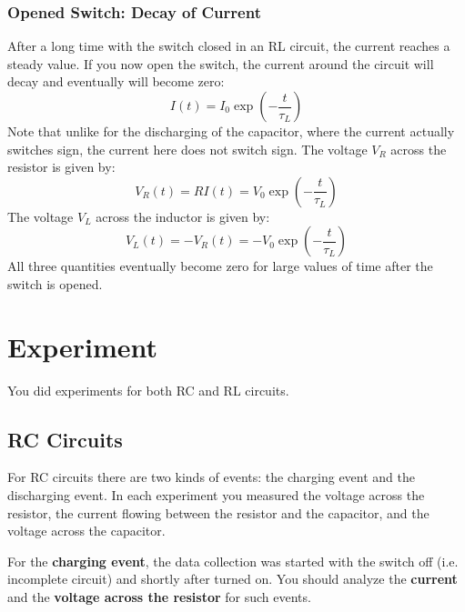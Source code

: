 \subsubsection{Opened Switch: Decay of Current}
After a long time with the switch closed in an RL circuit, the current reaches a steady value. If you now open the switch, the current around the circuit will decay and eventually will become zero:
\begin{equation}
    I(t) = I_{0} \exp\left(- \frac{t}{\tau_{L}}\right)
    \label{eq.05.RL.i.decay}
\end{equation}
Note that unlike for the discharging of the capacitor, where the current actually switches sign, the current here does not switch sign. The voltage $V_{R}$ across the resistor is given by:
\begin{equation}
    V_{R}(t) = R I(t) = V_{0} \exp\left(- \frac{t}{\tau_{L}}\right)
    \label{eq.05.RL.vR.decay}
\end{equation}
The voltage $V_{L}$ across the inductor is given by:
\begin{equation}
    V_{L}(t) = -V_{R}(t) = -V_{0} \exp\left(- \frac{t}{\tau_{L}}\right)
    \label{eq.05.RL.vL.decay}
\end{equation}
All three quantities eventually become zero for large values of time after the switch is opened.
\section{Experiment}
You did experiments for both RC and RL circuits.
\subsection{RC Circuits}
For RC circuits there are two kinds of events: the charging event and the discharging event. In each experiment you measured the voltage across the resistor, the current flowing between the resistor and the capacitor, and the voltage across the capacitor.

For the \textbf{charging event}, the data collection was started with the switch off (i.e. incomplete circuit) and shortly after turned on. You should analyze the \textbf{current} and the \textbf{voltage across the resistor} for such events.

